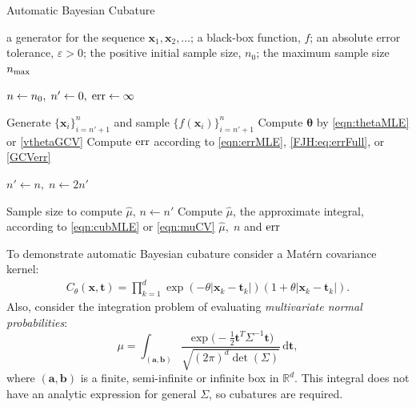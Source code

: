 \documentclass{iitthesis}          %
\newcommand{\bm}[1]{\boldsymbol{#1}}
\newcommand{\mSigma}{\mathsf{\Sigma}}
\newcommand{\dif}[1]{\text{d}{#1}}
\newcommand{\reals}{\mathbb{R}}
\newcommand{\vtheta}{{\bm{\theta}}}
\newcommand{\va}{\bm{a}}
\newcommand{\vb}{\bm{b}}
\newcommand{\vt}{\bm{t}}
\newcommand{\vx}{\bm{x}}
\newcommand{\dvt}{\dif{\bm{t}}}
\newcommand{\hmu}{\widehat{\mu}}
\newcommand{\err}{\textup{err}}
\begin{document}
\begin{algorithm}
\caption{Automatic Bayesian Cubature}\label{algorithm1}
  \begin{algorithmic}[1]
  	\Require a generator for the sequence
  	$\vx_1, \vx_2, \ldots$; 
  	a black-box function, $f$; 
  	an absolute error tolerance,
  	$\varepsilon>0$; the positive initial sample size, $n_0$;
  	the maximum sample size $n_{\textup{max}}$
  	
      \State $n \gets n_0, \; n' \gets 0, \; \err \gets \infty$
      
      \While{$\err > \varepsilon$ and $n \le n_{\textup{max}}$}
      
        \State\label{LoopStart}Generate $\{ \vx_i\}_{i=n' + 1}^{n}$ and sample $\{f(\vx_i)\}_{i=n'+1}^{n}$
        \State Compute $\vtheta$ by \eqref{eqn:thetaMLE} or \eqref{vthetaGCV}
        \State Compute $\err$  according to \eqref{eqn:errMLE}, \eqref{FJH:eq:errFull}, or \eqref{GCVerr}
        
       	\State	$n' \gets n, \; n \gets 2n'$
        
        \EndWhile
        
        \State Sample size to compute $\hmu$, $n \gets n'$
        \State Compute $\hmu$, the approximate integral,   according to \eqref{eqn:cubMLE} or \eqref{eqn:muCV}
      \State \Return $\hmu, \; n$  and $\err$
  \end{algorithmic}
\end{algorithm}

 \label{MVN_example}

To demonstrate automatic Bayesian cubature consider a Mat\'ern covariance kernel:
\begin{align*}
C_{\theta}(\vx, \vt) = \prod_{k=1}^d \exp(-\theta|\vx_k-\vt_k|)(1+\theta |\vx_k-\vt_k|).
\end{align*}
Also, consider the integration problem of evaluating  \emph{multivariate normal probabilities}:
\begin{equation}
\label{eqn:GaussDef}
\mu = \int_{(\va,\vb)} \frac{\exp\bigl(- \frac 12 \vt^T \mSigma^{-1} \vt \bigr)}{\sqrt{(2 \pi)^d \det(\mSigma)}} \, \dvt,
\end{equation}
where $(\va,\vb)$ is a finite, semi-infinite or infinite box in $\reals^d$.  This integral does not have an analytic expression for general $\mSigma$, so cubatures are required.  
\end{document}
